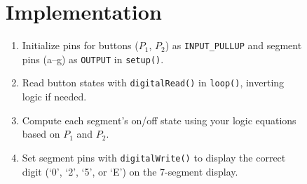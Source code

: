 \documentclass[12pt,a4paper]{article}
\begin{document}
\begin{figure}[H]
  \centering
  \begin{minipage}[t]{0.48\textwidth}
    \section*{Implementation}
    \small
    \begin{enumerate}
      \item Initialize pins for buttons ($P_1$, $P_2$) as \texttt{INPUT\_PULLUP} and segment pins (a–g) as \texttt{OUTPUT} in \texttt{setup()}.
      \item Read button states with \texttt{digitalRead()} in \texttt{loop()}, inverting logic if needed.
      \item Compute each segment’s on/off state using your logic equations based on $P_1$ and $P_2$.
      \item Set segment pins with \texttt{digitalWrite()} to display the correct digit (‘0’, ‘2’, ‘5’, or ‘E’) on the 7-segment display.
    \end{enumerate}
  \end{minipage}\hfill
  \begin{minipage}[t]{0.48\textwidth}
  \end{minipage}
\end{figure}
\end{document}
